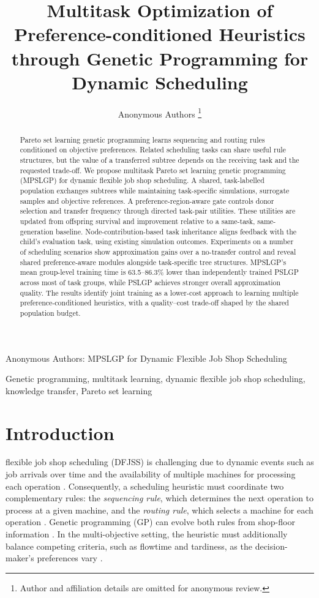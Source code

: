 \documentclass[10pt,journal]{IEEEtran}
\title{Multitask Optimization of Preference-conditioned Heuristics through Genetic Programming for Dynamic Scheduling}
\author{Anonymous Authors%
\thanks{Author and affiliation details are omitted for anonymous review.}%
}
\begin{document}
\raggedbottom
{}%
{Anonymous Authors: MPSLGP for Dynamic Flexible Job Shop Scheduling}
\maketitle

\begin{abstract}
Pareto set learning genetic programming learns sequencing and routing rules conditioned on objective preferences. Related scheduling tasks can share useful rule structures, but the value of a transferred subtree depends on the receiving task and the requested trade-off. We propose multitask Pareto set learning genetic programming (MPSLGP) for dynamic flexible job shop scheduling. A shared, task-labelled population exchanges subtrees while maintaining task-specific simulations, surrogate samples and objective references. A preference-region-aware gate controls donor selection and transfer frequency through directed task-pair utilities. These utilities are updated from offspring survival and improvement relative to a same-task, same-generation baseline. Node-contribution-based task inheritance aligns feedback with the child's evaluation task, using existing simulation outcomes. Experiments on a number of scheduling scenarios show approximation gains over a no-transfer control and reveal shared preference-aware modules alongside task-specific tree structures. MPSLGP's mean group-level training time is 63.5--86.3\% lower than independently trained PSLGP across most of task groups, while PSLGP achieves stronger overall approximation quality. The results identify joint training as a lower-cost approach to learning multiple preference-conditioned heuristics, with a quality--cost trade-off shaped by the shared population budget.
\end{abstract}

\begin{IEEEkeywords}
Genetic programming, multitask learning, dynamic flexible job shop scheduling, knowledge transfer, Pareto set learning
\end{IEEEkeywords}

\section{Introduction}
 flexible job shop scheduling (DFJSS) is challenging due to dynamic events such as job arrivals over time and the availability of multiple machines for processing each operation \cite{xu2025learn, zhao2025deep}. Consequently, a scheduling heuristic must coordinate two complementary rules: the \emph{sequencing rule}, which determines the next operation to process at a given machine, and the \emph{routing rule}, which selects a machine for each operation \cite{xu2026evospeak}. Genetic programming (GP) can evolve both rules from shop-floor information \cite{xu2023genetic}. In the multi-objective setting, the heuristic must additionally balance competing criteria, such as flowtime and tardiness, as the decision-maker's preferences vary \cite{li2025multi}.
\end{document}
